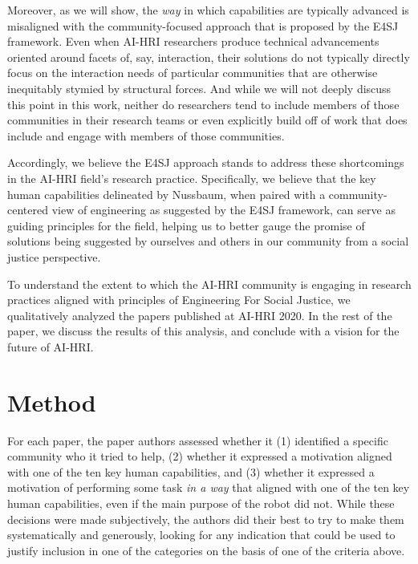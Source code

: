 \documentclass[letterpaper]{article} %
\begin{document}
Moreover, as we will show, the \textit{way} in which capabilities are typically advanced is misaligned with the community-focused approach that is proposed by the E4SJ framework.
Even when AI-HRI researchers produce technical advancements oriented around facets of, say, interaction, their solutions do not typically directly focus on the interaction needs of particular communities that are otherwise inequitably stymied by structural forces. And while we will not deeply discuss this point in this work, neither do researchers tend to include members of those communities in their research teams or even explicitly build off of work that does include and engage with members of those communities.

Accordingly, we believe the E4SJ approach stands to address these shortcomings in the AI-HRI field's research practice. Specifically, we believe that the key human capabilities delineated by Nussbaum, when paired with a community-centered view of engineering as suggested by the E4SJ framework, can serve as guiding principles for the field, helping us to better gauge the promise of solutions being suggested by ourselves and others in our community from a social justice perspective.



To understand the extent to which the AI-HRI community is engaging in research practices aligned with principles of Engineering For Social Justice, we qualitatively analyzed the papers published at AI-HRI 2020. In the rest of the paper, we discuss the results of this analysis, and conclude with a vision for the future of AI-HRI.

\section{Method}
For each paper, the paper authors assessed whether it (1) identified a specific community who it tried to help, (2) whether it expressed a motivation aligned with one of the ten key human capabilities, and (3) whether it expressed a motivation of performing some task \textit{in a way} that aligned with one of the ten key human capabilities, even if the main purpose of the robot did not. While these decisions were made subjectively, the authors did their best to try to make them systematically and generously, looking for any indication that could be used to justify inclusion in one of the categories on the basis of one of the criteria above.
\end{document}
